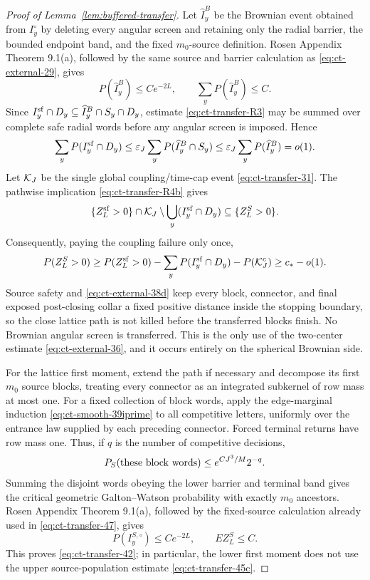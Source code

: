 \begin{proof}[Proof of Lemma~\ref{lem:buffered-transfer}]
Let $\widehat I_y^B$ be the Brownian event obtained from
$I_y^\circ$ by deleting every angular screen and retaining only the
radial barrier, the bounded endpoint band, and the fixed $m_0$-source
definition.  Rosen Appendix Theorem 9.1(a), followed by the same source
and barrier calculation as \eqref{eq:ct-external-29}, gives
\begin{equation}
P(\widehat I_y^B)\le Ce^{-2L},
             \qquad \sum_yP(\widehat I_y^B)\le C.\label{eq:ct-transfer-47}
\end{equation}
Since
$I_y^{\rm sf}\cap D_y\subseteq
  \widehat I_y^B\cap S_y\cap D_y$, estimate \eqref{eq:ct-transfer-R3} may be summed over
complete safe radial words before any angular screen is imposed.  Hence
\begin{equation}
\sum_yP(I_y^{\rm sf}\cap D_y)
 \le\varepsilon_J\sum_yP(\widehat I_y^B\cap S_y)
 \le\varepsilon_J\sum_yP(\widehat I_y^B)=o(1).\label{eq:ct-transfer-47a}
\end{equation}
Let ${\cal K}_J$ be the single global coupling/time-cap event \eqref{eq:ct-transfer-31}.
The pathwise implication \eqref{eq:ct-transfer-R4b} gives
\[
\{Z_L^{\rm sf}>0\}\cap{\cal K}_J
       \setminus\bigcup_y(I_y^{\rm sf}\cap D_y)
       \subseteq\{Z_L^S>0\}.
\]
Consequently, paying the coupling failure only once,
\begin{equation}
P(Z_L^S>0)\ge P(Z_L^{\rm sf}>0)
   -\sum_yP(I_y^{\rm sf}\cap D_y)-P({\cal K}_J^c)
 \ge c_*-o(1).\label{eq:ct-transfer-47b}
\end{equation}
Source safety and \eqref{eq:ct-external-38d} keep every block, connector, and final exposed
post-closing collar a fixed positive distance inside the stopping boundary,
so the close lattice path is not killed before the transferred blocks
finish.  No Brownian angular screen is transferred.
This is the only use of the two-center estimate \eqref{eq:ct-external-36}, and it occurs
entirely on the spherical Brownian side.

For the lattice first moment, extend the path if necessary and decompose
its first $m_0$ source blocks, treating every connector as an integrated
subkernel of row mass at most one.  For a fixed collection of block words,
apply the edge-marginal induction \eqref{eq:ct-smooth-39iprime} to all competitive letters,
uniformly over the entrance law supplied by each preceding connector.
Forced terminal returns have row mass one.  Thus, if $q$ is the number
of competitive decisions,
\[
P_S(\hbox{these block words})\le e^{CJ^3/M}2^{-q}.
\]
Summing the disjoint words obeying the lower barrier and terminal band gives
the critical geometric Galton--Watson probability with exactly $m_0$
ancestors.  Rosen Appendix Theorem 9.1(a), followed by the fixed-source
calculation already used in \eqref{eq:ct-transfer-47}, gives
\begin{equation}
P(I_y^{S,\circ})\le Ce^{-2L},\qquad EZ_L^S\le C.\label{eq:ct-transfer-47cprime}
\end{equation}
This proves \eqref{eq:ct-transfer-42}; in particular, the lower first moment does not use the
upper source-population estimate \eqref{eq:ct-transfer-45c}.


\end{proof}
